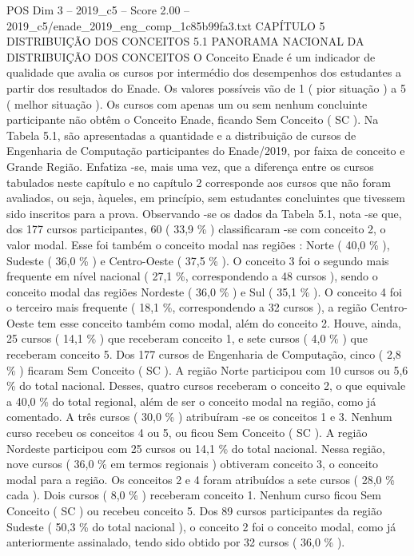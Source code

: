 \begin{textsample}{POS Dim 3 – 2019\_c5 – Score 2.00 – 2019\_c5/enade\_2019\_eng\_comp\_1c85b99fa3.txt}  \label{ex:f3_pos_079}
CAPÍTULO 5 DISTRIBUIÇÃO DOS CONCEITOS 5.1 PANORAMA NACIONAL DA DISTRIBUIÇÃO DOS CONCEITOS O Conceito Enade é um indicador de qualidade que avalia os cursos por intermédio dos desempenhos dos estudantes a partir dos resultados do Enade.
Os valores possíveis vão de 1 ( pior situação ) a 5 ( melhor situação ).
Os cursos com apenas um ou sem nenhum concluinte participante não obtêm o Conceito Enade, ficando Sem Conceito ( SC ).
Na Tabela 5.1, são apresentadas a quantidade e a distribuição de cursos de Engenharia de Computação participantes do Enade/2019, por faixa de conceito e Grande Região.
Enfatiza -se, mais uma vez, que a diferença entre os cursos tabulados neste capítulo e no capítulo 2 corresponde aos cursos que não foram avaliados, ou seja, àqueles, em princípio, sem estudantes concluintes que tivessem sido inscritos para a prova.
Observando -se os dados da Tabela 5.1, nota -se que, dos 177 cursos participantes, 60 ( 33,9 \% ) classificaram -se com conceito 2, o valor modal.
Esse foi também o conceito modal nas regiões : Norte ( 40,0 \% ), Sudeste ( 36,0 \% ) e Centro-Oeste ( 37,5 \% ).
O conceito 3 foi o segundo mais frequente em nível nacional ( 27,1 \%, correspondendo a 48 cursos ), sendo o conceito modal das regiões Nordeste ( 36,0 \% ) e Sul ( 35,1 \% ).
O conceito 4 foi o terceiro mais frequente ( 18,1 \%, correspondendo a 32 cursos ), a região Centro-Oeste tem esse conceito também como modal, além do conceito 2.
Houve, ainda, 25 cursos ( 14,1 \% ) que receberam conceito 1, e sete cursos ( 4,0 \% ) que receberam conceito 5.
Dos 177 cursos de Engenharia de Computação, cinco ( 2,8 \% ) ficaram Sem Conceito ( SC ).
A região Norte participou com 10 cursos ou 5,6 \% do total nacional.
Desses, quatro cursos receberam o conceito 2, o que equivale a 40,0 \% do total regional, além de ser o conceito modal na região, como já comentado.
A três cursos ( 30,0 \% ) atribuíram -se os conceitos 1 e 3.
Nenhum curso recebeu os conceitos 4 ou 5, ou ficou Sem Conceito ( SC ).
A região Nordeste participou com 25 cursos ou 14,1 \% do total nacional.
Nessa região, nove cursos ( 36,0 \% em termos regionais ) obtiveram conceito 3, o conceito modal para a região.
Os conceitos 2 e 4 foram atribuídos a sete cursos ( 28,0 \% cada ).
Dois cursos ( 8,0 \% ) receberam conceito 1.
Nenhum curso ficou Sem Conceito ( SC ) ou recebeu conceito 5.
Dos 89 cursos participantes da região Sudeste ( 50,3 \% do total nacional ), o conceito 2 foi o conceito modal, como já anteriormente assinalado, tendo sido obtido por 32 cursos ( 36,0 \% ).

\end{textsample}
